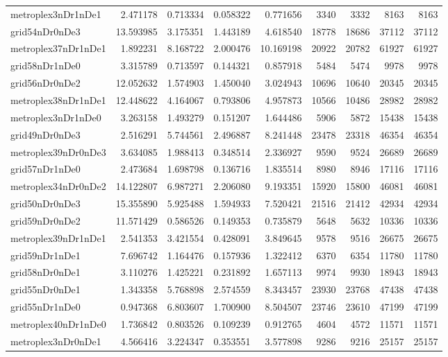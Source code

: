\begin{longtable}{|l|r|r|r|r|r|r|r|r|}
metroplex3nDr1nDe1 & 2.471178 & 0.713334 & 0.058322 & 0.771656 & 3340 & 3332 & 8163 & 8163 \\
grid54nDr0nDe3 & 13.593985 & 3.175351 & 1.443189 & 4.618540 & 18778 & 18686 & 37112 & 37112 \\
metroplex37nDr1nDe1 & 1.892231 & 8.168722 & 2.000476 & 10.169198 & 20922 & 20782 & 61927 & 61927 \\
grid58nDr1nDe0 & 3.315789 & 0.713597 & 0.144321 & 0.857918 & 5484 & 5474 & 9978 & 9978 \\
grid56nDr0nDe2 & 12.052632 & 1.574903 & 1.450040 & 3.024943 & 10696 & 10640 & 20345 & 20345 \\
metroplex38nDr1nDe1 & 12.448622 & 4.164067 & 0.793806 & 4.957873 & 10566 & 10486 & 28982 & 28982 \\
metroplex3nDr1nDe0 & 3.263158 & 1.493279 & 0.151207 & 1.644486 & 5906 & 5872 & 15438 & 15438 \\
grid49nDr0nDe3 & 2.516291 & 5.744561 & 2.496887 & 8.241448 & 23478 & 23318 & 46354 & 46354 \\
metroplex39nDr0nDe3 & 3.634085 & 1.988413 & 0.348514 & 2.336927 & 9590 & 9524 & 26689 & 26689 \\
grid57nDr1nDe0 & 2.473684 & 1.698798 & 0.136716 & 1.835514 & 8980 & 8946 & 17116 & 17116 \\
metroplex34nDr0nDe2 & 14.122807 & 6.987271 & 2.206080 & 9.193351 & 15920 & 15800 & 46081 & 46081 \\
grid50nDr0nDe3 & 15.355890 & 5.925488 & 1.594933 & 7.520421 & 21516 & 21412 & 42934 & 42934 \\
grid59nDr0nDe2 & 11.571429 & 0.586526 & 0.149353 & 0.735879 & 5648 & 5632 & 10336 & 10336 \\
metroplex39nDr1nDe1 & 2.541353 & 3.421554 & 0.428091 & 3.849645 & 9578 & 9516 & 26675 & 26675 \\
grid59nDr1nDe1 & 7.696742 & 1.164476 & 0.157936 & 1.322412 & 6370 & 6354 & 11780 & 11780 \\
grid58nDr0nDe1 & 3.110276 & 1.425221 & 0.231892 & 1.657113 & 9974 & 9930 & 18943 & 18943 \\
grid55nDr0nDe1 & 1.343358 & 5.768898 & 2.574559 & 8.343457 & 23930 & 23768 & 47438 & 47438 \\
grid55nDr1nDe0 & 0.947368 & 6.803607 & 1.700900 & 8.504507 & 23746 & 23610 & 47199 & 47199 \\
metroplex40nDr1nDe0 & 1.736842 & 0.803526 & 0.109239 & 0.912765 & 4604 & 4572 & 11571 & 11571 \\
metroplex3nDr0nDe1 & 4.566416 & 3.224347 & 0.353551 & 3.577898 & 9286 & 9216 & 25157 & 25157 \\

\end{longtable}
